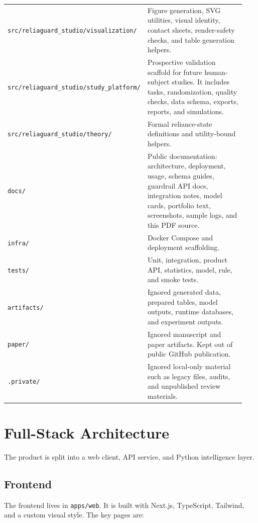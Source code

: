 \documentclass[11pt]{article}
\newcommand{\codepath}[1]{\nolinkurl{#1}}
\begin{document}
\begin{longtable}{p{0.28\linewidth} p{0.66\linewidth}}
\codepath{src/reliaguard\_studio/visualization/} & Figure generation, SVG utilities, visual identity, contact sheets, render-safety checks, and table generation helpers. \\
\codepath{src/reliaguard\_studio/study\_platform/} & Prospective validation scaffold for future human-subject studies. It includes tasks, randomization, quality checks, data schema, exports, reports, and simulations. \\
\codepath{src/reliaguard\_studio/theory/} & Formal reliance-state definitions and utility-bound helpers. \\
\codepath{docs/} & Public documentation: architecture, deployment, usage, schema guides, guardrail API docs, integration notes, model cards, portfolio text, screenshots, sample logs, and this PDF source. \\
\codepath{infra/} & Docker Compose and deployment scaffolding. \\
\codepath{tests/} & Unit, integration, product API, statistics, model, rule, and smoke tests. \\
\codepath{artifacts/} & Ignored generated data, prepared tables, model outputs, runtime databases, and experiment outputs. \\
\codepath{paper/} & Ignored manuscript and paper artifacts. Kept out of public GitHub publication. \\
\codepath{.private/} & Ignored local-only material such as legacy files, audits, and unpublished review materials. \\
\bottomrule
\end{longtable}

\section{Full-Stack Architecture}

The product is split into a web client, API service, and Python intelligence layer.

\subsection{Frontend}

The frontend lives in \codepath{apps/web}. It is built with Next.js, TypeScript, Tailwind, and a custom visual style. The key pages are:
\end{document}

